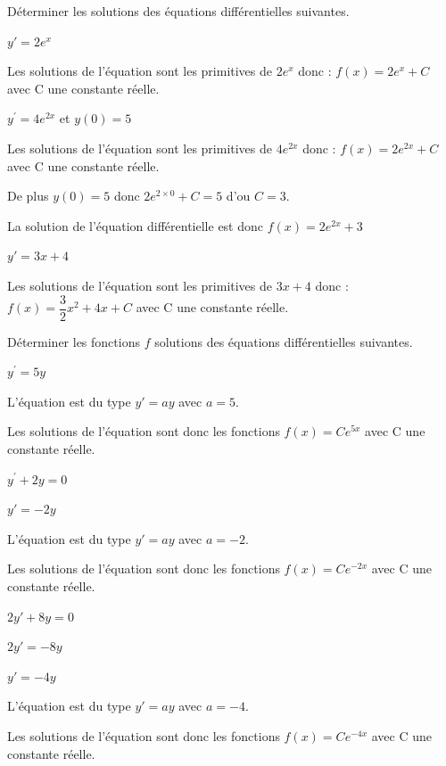 \documentclass[11pt,a4paper]{article}  %
\begin{document}
Déterminer les solutions des équations différentielles suivantes.
	\begin{enumMet}
		\item {} $y'=2e^x$
		\begin{corrBox}
			Les solutions de l'équation sont les primitives de $2e^x$ donc : $f(x)=2e^x+C$ avec C une constante réelle.
		\end{corrBox}
		\item $y^{\prime}=4 e^{2 x}$ et $y(0)=5$
		\begin{corrBox}
			Les solutions de l'équation sont les primitives de $4 e^{2 x}$ donc : $f(x)=2e^{2x}+C$ avec C une constante réelle.
			
			De plus $y(0)=5$ donc $2e^{2\times 0}+C=5$ d'ou $C=3$.
			
			La solution de l'équation différentielle est donc $f(x)=2e^{2x}+3$
		\end{corrBox}
		\item $y'=3x+4$
		\begin{corrBox}
			Les solutions de l'équation sont les primitives de $3x+4$ donc : $f(x)=\dfrac{3}{2}x^2+4x+C$ avec C une constante réelle.
		\end{corrBox}
	\end{enumMet}


\vspace*{-0.7cm}

Déterminer les fonctions $f$ solutions des équations différentielles suivantes.
	\begin{enumMet}
		\item {} $y^{\prime}=5 y$
		\begin{corrBox}
			L'équation est du type $y'=ay$ avec $a=5$. 
			
			Les solutions de l'équation sont donc les fonctions $f(x)=Ce^{5x}$ avec C une constante réelle.		
		\end{corrBox}
		\item {} $y^{\prime}+2y=0$
		\begin{corrBox}
			$y'=-2y$
			
			L'équation est du type $y'=ay$ avec $a=-2$. 
			
			Les solutions de l'équation sont donc les fonctions $f(x)=Ce^{-2x}$ avec C une constante réelle.		
		\end{corrBox}
		\item $2y'+8 y=0$
		\begin{corrBox}
			$2y'=-8y$
			
			$y'=-4y$
			
			L'équation est du type $y'=ay$ avec $a=-4$. 
			
			Les solutions de l'équation sont donc les fonctions $f(x)=Ce^{-4x}$ avec C une constante réelle.		
		\end{corrBox}
	\end{enumMet}
\end{document}
